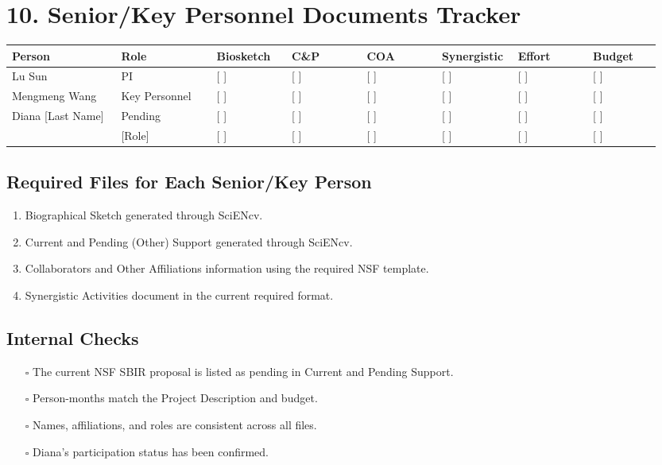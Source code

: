 \documentclass[11pt,letterpaper]{article}
\begin{document}
\section*{10. Senior/Key Personnel Documents Tracker}

\begin{longtable}{p{0.16\linewidth}p{0.14\linewidth}p{0.11\linewidth}p{0.11\linewidth}p{0.11\linewidth}p{0.11\linewidth}p{0.11\linewidth}p{0.10\linewidth}}
\textbf{Person} & \textbf{Role} & \textbf{Biosketch} & \textbf{C\&P} &
\textbf{COA} & \textbf{Synergistic} & \textbf{Effort} & \textbf{Budget} \\
\hline
Lu Sun & PI & [ ] & [ ] & [ ] & [ ] & [ ] & [ ] \\
Mengmeng Wang & Key Personnel & [ ] & [ ] & [ ] & [ ] & [ ] & [ ] \\
Diana [Last Name] & Pending & [ ] & [ ] & [ ] & [ ] & [ ] & [ ] \\
[Additional Person] & [Role] & [ ] & [ ] & [ ] & [ ] & [ ] & [ ] \\
\end{longtable}

\subsection*{Required Files for Each Senior/Key Person}
\begin{enumerate}
\item Biographical Sketch generated through SciENcv.
\item Current and Pending (Other) Support generated through SciENcv.
\item Collaborators and Other Affiliations information using the required NSF template.
\item Synergistic Activities document in the current required format.
\end{enumerate}

\subsection*{Internal Checks}
\begin{itemize}
\item[$\square$] The current NSF SBIR proposal is listed as pending in Current and Pending Support.
\item[$\square$] Person-months match the Project Description and budget.
\item[$\square$] Names, affiliations, and roles are consistent across all files.
\item[$\square$] Diana's participation status has been confirmed.
\end{itemize}
\end{document}
